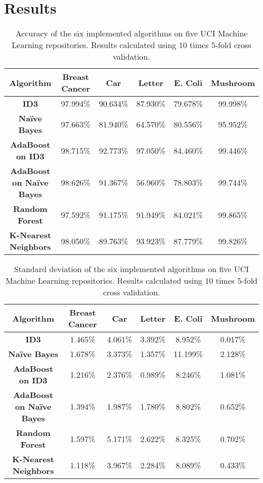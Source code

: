 \documentclass[11pt]{article}
\newcommand{\bb}{\textbf}
\begin{document}
\section{Results}
\begin{table}
  \begin{tabular}{ |c|c|c|c|c|c| }
    \hline
    \bb{Algorithm}               & \bb{Breast Cancer} & \bb{Car} & \bb{Letter} & \bb{E. Coli}  & \bb{Mushroom} \\ \hline
    \bb{ID3}                     & 97.994\%           & 90.634\% & 87.930\%    & 79.678\%      & 99.998\%      \\ \hline
    \bb{Naïve Bayes}             & 97.663\%           & 81.940\% & 64.570\%    & 80.556\%      & 95.952\%      \\ \hline
    \bb{AdaBoost on ID3}         & 98.715\%           & 92.773\% & 97.050\%    & 84.460\%      & 99.446\%      \\ \hline
    \bb{AdaBoost on Naïve Bayes} & 98.626\%           & 91.367\% & 56.960\%    & 78.803\%      & 99.744\%      \\ \hline
    \bb{Random Forest}           & 97.592\%           & 91.175\% & 91.949\%    & 84.021\%      & 99.865\%      \\ \hline
    \bb{K-Nearest Neighbors}     & 98.050\%           & 89.763\% & 93.923\%    & 87.779\%      & 99.826\%      \\ \hline
  \end{tabular}
  \caption{Accuracy of the six implemented algorithms on five UCI Machine Learning repositories. Results calculated using 10 times 5-fold cross validation.}
  \label{table:accuracies}
\end{table}

\begin{table}
  \begin{tabular}{ |c|c|c|c|c|c| }
    \hline
    \bb{Algorithm}               & \bb{Breast Cancer} & \bb{Car} & \bb{Letter} & \bb{E. Coli}  & \bb{Mushroom} \\ \hline
    \bb{ID3}                     & 1.465\%            & 4.061\%  & 3.392\%     & 8.952\%       & 0.017\%       \\ \hline
    \bb{Naïve Bayes}             & 1.678\%            & 3.373\%  & 1.357\%     & 11.199\%      & 2.128\%       \\ \hline
    \bb{AdaBoost on ID3}         & 1.216\%            & 2.376\%  & 0.989\%     & 8.246\%       & 1.081\%       \\ \hline
    \bb{AdaBoost on Naïve Bayes} & 1.394\%            & 1.987\%  & 1.780\%     & 8.802\%       & 0.652\%       \\ \hline
    \bb{Random Forest}           & 1.597\%            & 5.171\%  & 2.622\%     & 8.325\%       & 0.702\%       \\ \hline
    \bb{K-Nearest Neighbors}     & 1.118\%            & 3.967\%  & 2.284\%     & 8.089\%       & 0.433\%       \\ \hline
  \end{tabular}
  \caption{Standard deviation of the six implemented algorithms on five UCI Machine Learning repositories. Results calculated using 10 times 5-fold cross validation.}
\end{table}
\end{document}
